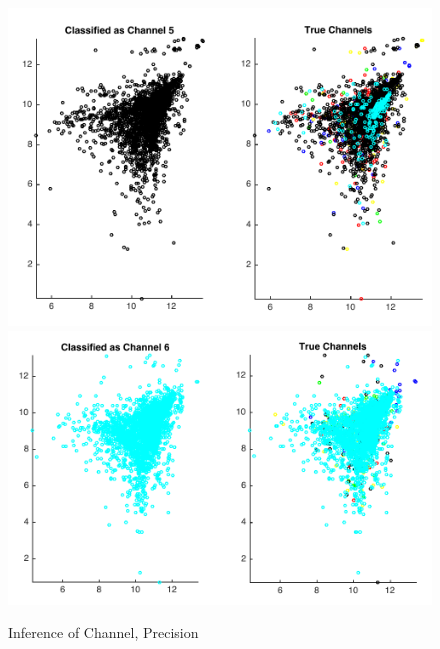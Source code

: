 \documentclass{article} %
\begin{document}
\begin{figure}[h!]
 \includegraphics[scale = 0.38]{precisionFig5.pdf}\hspace{0.5cm}
 \includegraphics[scale = 0.4]{precisionFig6.pdf} 
 \caption{Inference of Channel, Precision}
 \label{channelPres}
\end{figure}
\end{document}
